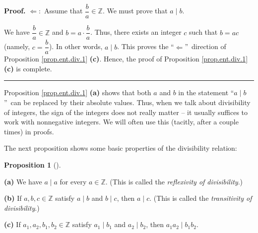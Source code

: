 \documentclass[numbers=enddot,12pt,final,onecolumn,notitlepage]{scrartcl}%
\numberwithin{exer}{subsection}
\theoremstyle{definition}
\newtheorem{prop}[theo]{Proposition}
\newenvironment{proposition}[1][]
{\begin{prop}[#1]\begin{leftbar}}
{\end{leftbar}\end{prop}}
\newenvironment{proof}[1][Proof]{\noindent\textbf{#1.} }{\ \rule{0.5em}{0.5em}}
\begin{document}
\begin{proof}
$\Longleftarrow:$ Assume that $\dfrac{b}{a}\in\mathbb{Z}$. We must prove that
$a\mid b$.

We have $\dfrac{b}{a}\in\mathbb{Z}$ and $b=a\cdot\dfrac{b}{a}$. Thus, there
exists an integer $c$ such that $b=ac$ (namely, $c=\dfrac{b}{a}$). In other
words, $a\mid b$. This proves the \textquotedblleft$\Longleftarrow
$\textquotedblright\ direction of Proposition \ref{prop.ent.div.1}
\textbf{(c)}. Hence, the proof of Proposition \ref{prop.ent.div.1}
\textbf{(c)} is complete.
\end{proof}

Proposition \ref{prop.ent.div.1} \textbf{(a)} shows that both $a$ and $b$ in
the statement \textquotedblleft$a\mid b$\textquotedblright\ can be replaced by
their absolute values. Thus, when we talk about divisibility of integers, the
sign of the integers does not really matter -- it usually suffices to work
with nonnegative integers. We will often use this (tacitly, after a couple
times) in proofs.

The next proposition shows some basic properties of the divisibility relation:

\begin{proposition}
\label{prop.ent.div.2}\textbf{(a)} We have $a\mid a$ for every $a\in
\mathbb{Z}$. (This is called the \textit{reflexivity of divisibility}.)

\textbf{(b)} If $a,b,c\in\mathbb{Z}$ satisfy $a\mid b$ and $b\mid c$, then
$a\mid c$. (This is called the \textit{transitivity of divisibility}.)

\textbf{(c)} If $a_{1},a_{2},b_{1},b_{2}\in\mathbb{Z}$ satisfy $a_{1}\mid
b_{1}$ and $a_{2}\mid b_{2}$, then $a_{1}a_{2}\mid b_{1}b_{2}$.
\end{proposition}
\end{document}
